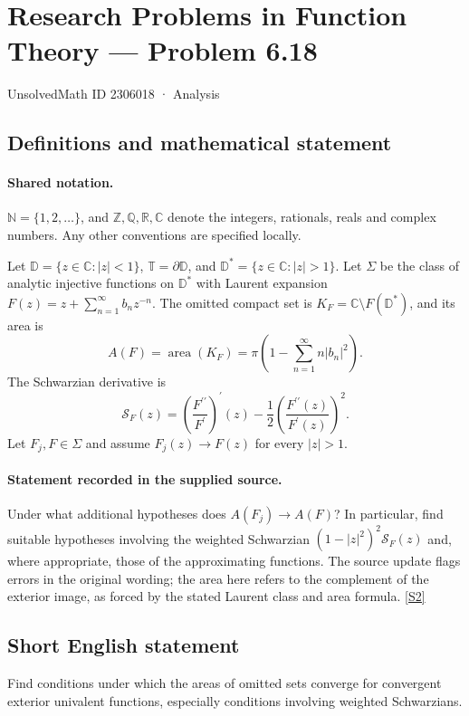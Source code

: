 \documentclass[11pt]{book}
\newcommand{\sref}[2]{\hyperlink{source:#1:#2}{[S#2]}}
\begin{document}
\setcounter{section}{2306017}
\section{Research Problems in Function Theory — Problem 6.18}\label{2306018}
{\small\sffamily UnsolvedMath ID 2306018 · Analysis}
\subsection{Definitions and mathematical statement}

\paragraph{Shared notation.}$\mathbb N=\{1,2,\ldots\}$, and $\mathbb Z,\mathbb Q,\mathbb R,\mathbb C$ denote the integers, rationals, reals and complex numbers. Any other conventions are specified locally.


Let $\mathbb D=\{z\in\mathbb C:|z|<1\}$, $\mathbb T=\partial\mathbb D$, and $\mathbb D^*=\{z\in\mathbb C:|z|>1\}$. Let $\Sigma$ be the class of analytic injective functions on $\mathbb D^*$ with Laurent expansion $F(z)=z+\sum_{n=1}^{\infty}b_nz^{-n}$. The omitted compact set is $K_F=\mathbb C\setminus F(\mathbb D^*)$, and its area is \[A(F)=\operatorname{area}(K_F)=\pi\left(1-\sum_{n=1}^{\infty}n|b_n|^2\right).\] The Schwarzian derivative is \[\mathcal S_F(z)=\left(\frac{F^{\prime\prime}}{F^{\prime}}\right)^{\prime}(z)-\frac12\left(\frac{F^{\prime\prime}(z)}{F^{\prime}(z)}\right)^2.\] Let $F_j,F\in\Sigma$ and assume $F_j(z)\to F(z)$ for every $|z|>1$.
\paragraph{Statement recorded in the supplied source.}
Under what additional hypotheses does $A(F_j)\to A(F)$? In particular, find suitable hypotheses involving the weighted Schwarzian $(1-|z|^2)^2\mathcal S_F(z)$ and, where appropriate, those of the approximating functions. The source update flags errors in the original wording; the area here refers to the complement of the exterior image, as forced by the stated Laurent class and area formula. \sref{2306018}{2}
\subsection{Short English statement}
Find conditions under which the areas of omitted sets converge for convergent exterior univalent functions, especially conditions involving weighted Schwarzians.
\end{document}

